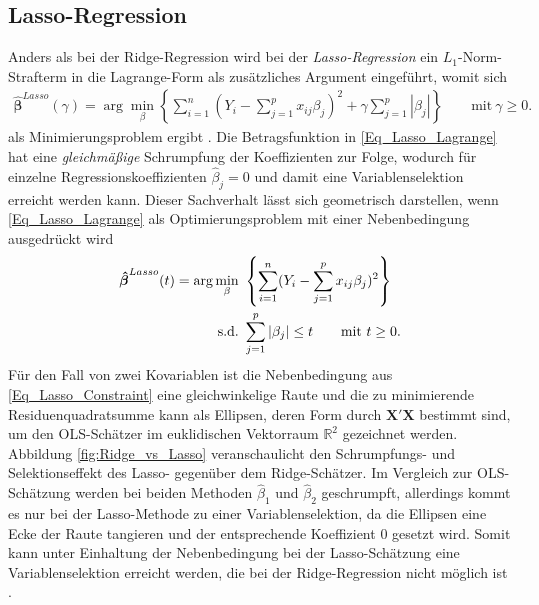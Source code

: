 \documentclass[12pt, a4paper]{report}\usepackage[]{graphicx}\usepackage[]{color}
\begin{document}
\subsection{Lasso-Regression}\label{Kap_Lasso-Regression}
Anders als bei der Ridge-Regression wird bei der \textit{Lasso-Regression} ein $L_1$-Norm-Strafterm in die Lagrange-Form als zusätzliches Argument eingeführt, womit sich
\begin{align}\label{Eq_Lasso_Lagrange}
\boldsymbol{\hat{\beta}}^{Lasso}(\gamma)=\arg \displaystyle\min_{\beta} \left\lbrace \sum_{i=1}^{n} (Y_i - \sum_{j=1}^{p} x_{ij} \beta_j)^2  + \gamma \sum_{j=1}^{p}|\beta_j| \right\rbrace \qquad \text{mit} \ \gamma \ge 0.
\end{align}
als Minimierungsproblem ergibt \cite{tibshirani96regression}. Die Betragsfunktion in \eqref{Eq_Lasso_Lagrange} hat eine \textit{gleichmäßige} Schrumpfung der Koeffizienten zur Folge, wodurch für einzelne Regressionskoeffizienten $\hat{\beta}_j =0$  und damit eine Variablenselektion erreicht werden kann. Dieser Sachverhalt lässt sich geometrisch darstellen, wenn \eqref{Eq_Lasso_Lagrange} als Optimierungsproblem mit einer Nebenbedingung ausgedrückt wird
\begin{align}\label{Eq_Lasso_Constraint}
\boldsymbol{\hat{\beta}}^{Lasso}(t)=\arg \displaystyle\min_{\beta} \ &\left\lbrace \sum_{i=1}^{n} (Y_i - \sum_{j=1}^{p} x_{ij} \beta_j)^2 \right\rbrace \notag  \\
\text{s.d.} \ & \sum_{j=1}^{p}|\beta_j| \le t  \qquad \text{mit} \ t \ge 0.
\end{align}
Für den Fall von zwei Kovariablen ist die Nebenbedingung aus \eqref{Eq_Lasso_Constraint} eine gleichwinkelige Raute und die zu minimierende Residuenquadratsumme kann als Ellipsen, deren Form durch $\mathbf{X}'\mathbf{X}$ bestimmt sind, um den OLS-Schätzer im euklidischen Vektorraum $\mathbb{R}^2$ gezeichnet werden. Abbildung \ref{fig:Ridge_vs_Lasso} veranschaulicht den Schrumpfungs- und Selektionseffekt des Lasso- gegenüber dem Ridge-Schätzer. Im Vergleich zur OLS-Schätzung werden bei beiden Methoden $\hat{\beta}_1$ und $\hat{\beta}_2$ geschrumpft, allerdings kommt es nur bei der Lasso-Methode zu einer Variablenselektion, da die Ellipsen eine Ecke der Raute tangieren und der entsprechende Koeffizient $0$ gesetzt wird. Somit kann unter Einhaltung der Nebenbedingung bei der Lasso-Schätzung eine Variablenselektion erreicht werden, die bei der Ridge-Regression nicht möglich ist \cite{tibshirani96regression}.\\ 
\end{document}
